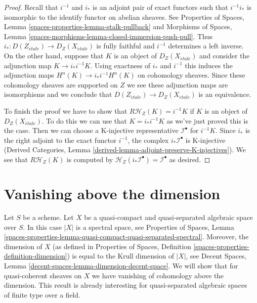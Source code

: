 \documentclass{stacks-project}
\theoremstyle{plain}
\theoremstyle{definition}
\theoremstyle{remark}
\numberwithin{equation}{subsection}
\def\etale{{\acute{e}tale}}
\begin{document}
\begin{proof}
Recall that $i^{-1}$ and $i_*$ is an adjoint pair of
exact functors such that $i^{-1}i_*$ is isomorphic to the identify
functor on abelian sheaves. See
Properties of Spaces, Lemma
\ref{spaces-properties-lemma-stalk-pullback} and
Morphisms of Spaces, Lemma
\ref{spaces-morphisms-lemma-closed-immersion-push-pull}.
Thus $i_* : D(Z_\etale) \to D_Z(X_\etale)$ is fully faithful and
$i^{-1}$ determines
a left inverse. On the other hand, suppose that $K$ is an object of
$D_Z(X_\etale)$ and consider the adjunction map
$K \to i_*i^{-1}K$.
Using exactness of $i_*$ and $i^{-1}$
this induces the adjunction maps
$H^n(K) \to i_*i^{-1}H^n(K)$ on cohomology sheaves.
Since these cohomology
sheaves are supported on $Z$ we see these adjunction maps are isomorphisms
and we conclude that $D(Z_\etale) \to D_Z(X_\etale)$ is an equivalence.

\medskip\noindent
To finish the proof we have to show that $R\mathcal{H}_Z(K) = i^{-1}K$
if $K$ is an object of $D_Z(X_\etale)$. To do this we can use that
$K = i_*i^{-1}K$
as we've just proved this is the case. Then we
can choose a K-injective representative $\mathcal{I}^\bullet$ for
$i^{-1}K$.
Since $i_*$ is the right adjoint to the exact functor
$i^{-1}$, the
complex $i_*\mathcal{I}^\bullet$ is K-injective
(Derived Categories, Lemma \ref{derived-lemma-adjoint-preserve-K-injectives}).
We see that $R\mathcal{H}_Z(K)$ is computed by
$\mathcal{H}_Z(i_*\mathcal{I}^\bullet) = \mathcal{I}^\bullet$
as desired.
\end{proof}






\section{Vanishing above the dimension}
\label{section-vanishing-above-dimension}

\noindent
Let $S$ be a scheme. Let $X$ be a quasi-compact and quasi-separated
algebraic space over $S$. In this case $|X|$ is a spectral space, see
Properties of Spaces, Lemma
\ref{spaces-properties-lemma-quasi-compact-quasi-separated-spectral}.
Moreover, the dimension of $X$ (as defined in
Properties of Spaces, Definition \ref{spaces-properties-definition-dimension})
is equal to the Krull dimension of $|X|$, see
Decent Spaces, Lemma \ref{decent-spaces-lemma-dimension-decent-space}.
We will show that for quasi-coherent sheaves on $X$ we have vanishing of
cohomology above the dimension. This result is already interesting for
quasi-separated algebraic spaces of finite type over a field.
\end{document}
